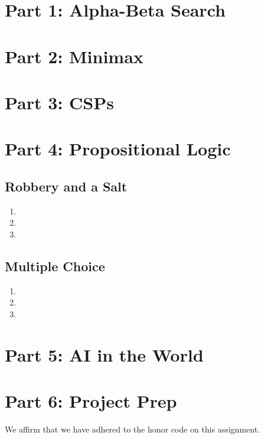 \documentclass[11pt]{amsart}
\newcommand{\honor}{We affirm that we have adhered to the honor code on this assignment.}
\begin{document}
\maketitle

\section*{Part 1: Alpha-Beta Search}

\section*{Part 2: Minimax}

\section*{Part 3: CSPs}

\section*{Part 4: Propositional Logic}

\subsection*{Robbery and a Salt}

\begin{enumerate}
\item
\item
\item
\end{enumerate}

\subsection*{Multiple Choice}

\begin{enumerate}
\item
\item
\item
\end{enumerate}

\section*{Part 5: AI in the World}

\section*{Part 6: Project Prep}

\honor
\end{document}
